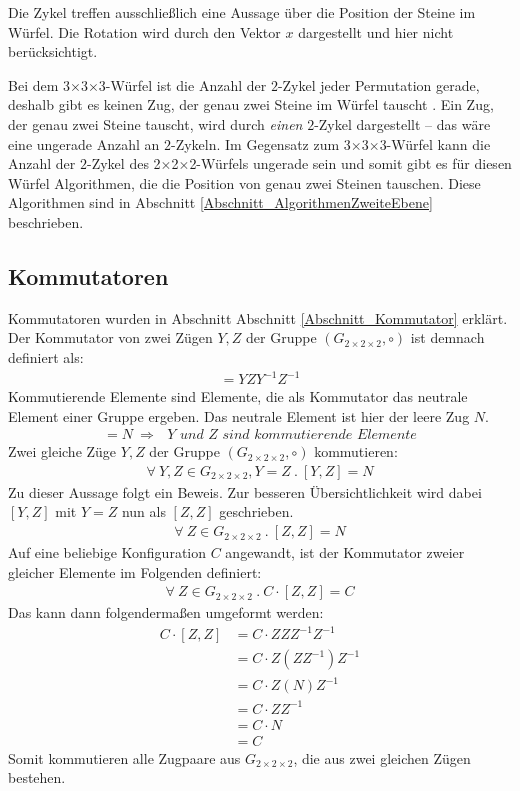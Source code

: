 \documentclass[12pt,a4paper, usenames, dvipsnames]{article}
\theoremstyle{mystyle}
\theoremstyle{definition}
\newcommand{\Gtwo}{\ensuremath{G_{2\times 2\times 2}}}
\newcommand{\Ttwo}{2$\times$2$\times$2-}
\newcommand{\Tthree}{3$\times$3$\times$3-}
\begin{document}
Die Zykel treffen ausschließlich eine Aussage über die Position der Steine im Würfel. Die Rotation wird durch den Vektor $x$ dargestellt und hier nicht berücksichtigt. 

Bei dem \Tthree Würfel ist die Anzahl der $2$-Zykel jeder Permutation gerade, deshalb gibt es keinen Zug, der genau zwei Steine im Würfel tauscht \cite{TD}. Ein Zug, der genau zwei Steine tauscht, wird durch \textit{einen} $2$-Zykel dargestellt -- das wäre eine ungerade Anzahl an $2$-Zykeln. Im Gegensatz zum \Tthree Würfel kann die Anzahl der $2$-Zykel des \Ttwo Würfels ungerade sein und somit gibt es für diesen Würfel Algorithmen, die die Position von genau zwei Steinen tauschen. Diese Algorithmen sind in Abschnitt \ref{Abschnitt_AlgorithmenZweiteEbene} beschrieben. 

%
%
%
%
%
%
%
%
%
%
%
%
%
%
%
%
%
%
%
%
\subsection{Kommutatoren}
\label{Abschnitt_Kommutatoren8}

Kommutatoren wurden in Abschnitt Abschnitt \ref{Abschnitt_Kommutator} erklärt. Der Kommutator von zwei Zügen $Y, Z$ der Gruppe $(\Gtwo, \circ)$ ist demnach definiert als:
\begin{align*}
[Y,Z]=YZY^{-1}Z^{-1}
\end{align*}
Kommutierende Elemente sind Elemente, die als Kommutator das neutrale Element einer Gruppe ergeben. Das neutrale Element ist hier der leere Zug $N$.
\begin{align*}
[Y,Z]= N\ \Rightarrow \textit{ $Y$ und $Z$ sind kommutierende Elemente}
\end{align*}
Zwei gleiche Züge $Y, Z$ der Gruppe $(\Gtwo, \circ)$ kommutieren:
\begin{align*}
\forall \ Y, Z \in \Gtwo, Y = Z \ . \ [Y, Z] = N
\end{align*}
Zu dieser Aussage folgt ein Beweis. Zur besseren Übersichtlichkeit wird dabei $[Y,Z]$ mit $Y=Z$ nun als $[Z,Z]$ geschrieben.
\begin{align*}
\forall \ Z \in \Gtwo\ . \ [Z, Z] = N
\end{align*}
Auf eine beliebige Konfiguration $C$ angewandt, ist der Kommutator zweier gleicher Elemente im Folgenden definiert:
\begin{align*}
\forall \ Z \in \Gtwo\ . \ C \cdot [Z, Z] = C
\end{align*}
Das kann dann folgendermaßen umgeformt werden:
\begin{align*}
C \cdot [Z, Z] & = C \cdot ZZZ^{-1}Z^{-1} \\
& = C \cdot Z(ZZ^{-1})Z^{-1} \\
& = C \cdot Z(N)Z^{-1} \\
& = C \cdot ZZ^{-1} \\
& = C \cdot N \\
& = C
\end{align*}
Somit kommutieren alle Zugpaare aus $\Gtwo$, die aus zwei gleichen Zügen bestehen.
\end{document}
